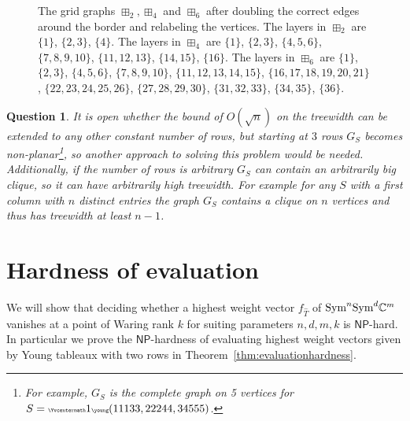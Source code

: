 \documentclass[10pt,a4paper]{article}
\numberwithin{equation}{section}
\newtheorem{question}[equation]{Question}
\theoremstyle{definition}
\newcommand{\Sym}{\textup{Sym}}
\newcommand{\IC}{\mathbb{C}}
\newcommand{\NP}{\ensuremath{\mathsf{NP}}}
\begin{document}
\begin{figure}[tpb]
    \caption{The grid graphs $\boxplus_{2}, \boxplus_{4}$ and $\boxplus_{6}$ after doubling the correct edges around the border and relabeling the vertices. The layers in $\boxplus_{2}$ are $\{1\}$, $\{2,3\}$, $\{4\}$.
    The layers in $\boxplus_{4}$ are $\{1\}$, $\{2,3\}$, $\{4,5,6\}$, $\{7,8,9,10\}$, $\{11,12,13\}$, $\{14,15\}$, $\{16\}$.
    The layers in $\boxplus_{6}$ are $\{1\}$, $\{2,3\}$, $\{4,5,6\}$, $\{7,8,9,10\}$, $\{11,12,13,14,15\}$, $\{16,17,18,19,20,21\}$, $\{22,23,24,25,26\}$, $\{27,28,29,30\}$, $\{31,32,33\}$, $\{34,35\}$, $\{36\}$.
    }
    \label{fig:regularmultigrid}
\end{figure}

\begin{question}
    It is open whether the bound of $O(\sqrt{n})$ on the treewidth can be extended to any other constant number of rows, but starting at $3$ rows $G_S$ becomes non-planar\footnote{For example, $G_S$ is the complete graph on 5 vertices for $S={\tiny\Yvcentermath1\young(11133,22244,34555)}$.}, so another approach to solving this problem would be needed.
    Additionally, if the number of rows is arbitrary $G_S$ can contain an arbitrarily big clique, so it can have arbitrarily high treewidth.
    For example for any $S$ with a first column with $n$ distinct entries the graph $G_S$ contains a clique on $n$ vertices and thus has treewidth at least $n-1$.
\end{question}


\section{Hardness of evaluation}
\label{sec:hardness}

We will show that deciding whether a highest weight vector $f_{\hat{T}}$ of $\Sym^n\Sym^d \IC^m$ vanishes at a point of Waring rank $k$ for suiting parameters $n, d, m, k$ is \NP-hard.
In particular we prove the $\NP$-hardness of evaluating highest weight vectors given by Young tableaux with two rows in Theorem~\ref{thm:evaluationhardness}.
\end{document}
